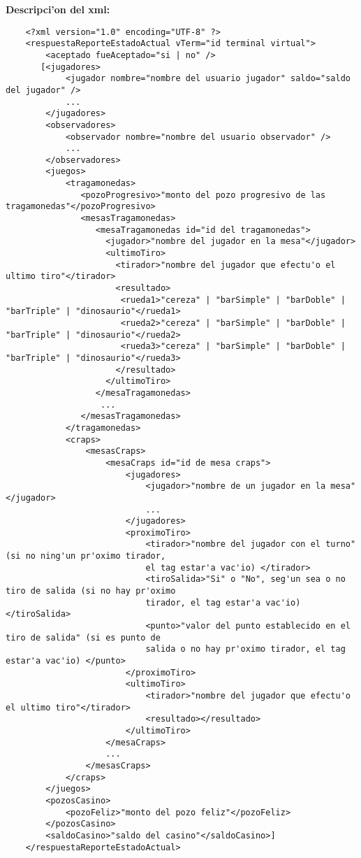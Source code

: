 \bf{Descripci'on del xml:}
\begin{verbatim}
    <?xml version="1.0" encoding="UTF-8" ?>
    <respuestaReporteEstadoActual vTerm="id terminal virtual">
        <aceptado fueAceptado="si | no" />
       [<jugadores>
            <jugador nombre="nombre del usuario jugador" saldo="saldo del jugador" />
            ... 
        </jugadores>
        <observadores>
            <observador nombre="nombre del usuario observador" />
            ...
        </observadores>
        <juegos>
            <tragamonedas>
               <pozoProgresivo>"monto del pozo progresivo de las tragamonedas"</pozoProgresivo>
               <mesasTragamonedas>
                  <mesaTragamonedas id="id del tragamonedas">
                    <jugador>"nombre del jugador en la mesa"</jugador>
                    <ultimoTiro>
                      <tirador>"nombre del jugador que efectu'o el ultimo tiro"</tirador>
                      <resultado>
                       <rueda1>"cereza" | "barSimple" | "barDoble" | "barTriple" | "dinosaurio"</rueda1>
                       <rueda2>"cereza" | "barSimple" | "barDoble" | "barTriple" | "dinosaurio"</rueda2>
                       <rueda3>"cereza" | "barSimple" | "barDoble" | "barTriple" | "dinosaurio"</rueda3>
                      </resultado>
                    </ultimoTiro>
                  </mesaTragamonedas>
                   ...
               </mesasTragamonedas>
            </tragamonedas>
            <craps>
                <mesasCraps>
                    <mesaCraps id="id de mesa craps">
                        <jugadores>
                            <jugador>"nombre de un jugador en la mesa"</jugador>
                            ...
                        </jugadores>
                        <proximoTiro>
                            <tirador>"nombre del jugador con el turno" (si no ning'un pr'oximo tirador,
                            el tag estar'a vac'io) </tirador>
                            <tiroSalida>"Si" o "No", seg'un sea o no tiro de salida (si no hay pr'oximo
                            tirador, el tag estar'a vac'io) </tiroSalida>
                            <punto>"valor del punto establecido en el tiro de salida" (si es punto de
                            salida o no hay pr'oximo tirador, el tag estar'a vac'io) </punto>
                        </proximoTiro>
                        <ultimoTiro>
                            <tirador>"nombre del jugador que efectu'o el ultimo tiro"</tirador>
                            <resultado></resultado>
                        </ultimoTiro>
                    </mesaCraps>
                    ...
                </mesasCraps>
            </craps>
        </juegos>
        <pozosCasino>
            <pozoFeliz>"monto del pozo feliz"</pozoFeliz>
        </pozosCasino>
        <saldoCasino>"saldo del casino"</saldoCasino>]
    </respuestaReporteEstadoActual>
\end{verbatim}


